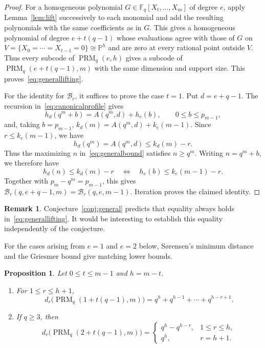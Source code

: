 \documentclass[11pt]{amsart}
\newtheorem{proposition}[theorem]{Proposition}
\theoremstyle{definition}
\newtheorem{remark}[theorem]{Remark}
\newcommand{\F}{\mathbb F}
\newcommand{\PP}{\mathbb P}
\newcommand{\PRM}{\operatorname{PRM}}
\numberwithin{equation}{section}
\begin{document}
\begin{proof}
For a homogeneous polynomial $G\in\F_q[X_t,\ldots,X_m]$ of degree $e$,
apply Lemma~\ref{lem:lift} successively to each monomial and add the
resulting polynomials with the same coefficients as in $G$.
This gives a homogeneous polynomial of degree $e+t(q-1)$ whose
evaluations agree with those of $G$ on
$V=\{X_0=\cdots=X_{t-1}=0\}\cong\PP^h$ and are zero at every
rational point outside $V$. Thus every subcode of $\PRM_q(e,h)$
gives a subcode of $\PRM_q(e+t(q-1),m)$ with the same dimension
and support size. This proves~\eqref{eq:generallifting}.

For the identity for $\mathcal B_r$, it suffices to prove the case
$t=1$. Put $d=e+q-1$.
The recursion in~\eqref{eq:canonicalprofile} gives
\[
 h_d(q^m+b)=A(q^m,d)+h_e(b),
 \qquad 0\le b\le p_{m-1},
\]
and, taking $b=p_{m-1}$,
$k_d(m)=A(q^m,d)+k_e(m-1)$. Since $r\le k_e(m-1)$, we have
\[
 h_d(q^m)=A(q^m,d)\le k_d(m)-r.
\]
Thus the maximizing $n$ in~\eqref{eq:generalbound}
satisfies $n\ge q^m$. Writing $n=q^m+b$, we therefore have
\[
 h_d(n)\le k_d(m)-r
 \quad\Longleftrightarrow\quad
 h_e(b)\le k_e(m-1)-r.
\]
Together with $p_m-q^m=p_{m-1}$, this gives
$\mathcal B_r(q,e+q-1,m)=\mathcal B_r(q,e,m-1)$.
Iteration proves the claimed identity.
\end{proof}

\begin{remark}
Conjecture~\ref{conj:general} predicts that equality
always holds in~\eqref{eq:generallifting}.
It would be interesting to establish this equality
independently of the conjecture.
\end{remark}

For the cases arising from $e=1$ and $e=2$ below, S{\o}rensen's
minimum distance and the Griesmer bound give matching lower bounds.

\begin{proposition}\label{prop:lifts}
Let $0\le t\le m-1$ and $h=m-t$.
\begin{enumerate}[label=\textup{(\alph*)}]
\item For $1\le r\le h+1$,
 \[
  d_r\bigl(\PRM_q(1+t(q-1),m)\bigr)=q^h+q^{h-1}+\cdots+q^{h-r+1}.
 \]
\item If $q\ge3$, then
 \[
  d_r\bigl(\PRM_q(2+t(q-1),m)\bigr)=
  \begin{cases}
  q^h-q^{h-r},&1\le r\le h,\\
  q^h,&r=h+1.
  \end{cases}
 \]
\end{enumerate}
\end{proposition}
\end{document}
